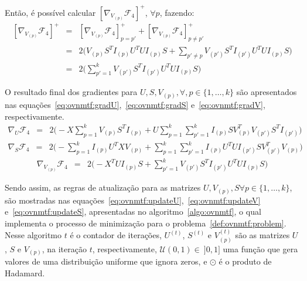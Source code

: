 \documentclass[
    12pt,                %
    oneside,            %
    a4paper,            %
    english,            %
    brazil                %
    ]{abntex2ppgsi}
\begin{document}
Então, é possível calcular $[\nabla_{V_{(p)}} \mathcal{F}_4]^{+}$, $\forall p$, fazendo:
\[
    \begin{array}{lcl}
        [\nabla_{V_{(p)}} \mathcal{F}_4]^{+} & = & [\nabla_{V_{(p)}} \mathcal{F}_4]^{+}_{p = p'} + [\nabla_{V_{(p)}} \mathcal{F}_4]^{+}_{p \neq p'} \\
                                             & = & 2 \big( V_{(p)} S^T I_{(p)} U^T U I_{(p)} S + \sum_{p' \neq p} V_{(p')} S^T I_{(p')} U^T U I_{(p)} S \big) \\
                                             & = & 2 \big( \sum_{p'=1}^{k} V_{(p')} S^T I_{(p')} U^T U I_{(p)} S \big)
    \end{array}
\]

O resultado final dos gradientes para $U, S, V_{(p)}, \forall, p \in \{1, \dots, k\}$ são apresentados nas equações~\ref{eq:ovnmtf:gradU},~\ref{eq:ovnmtf:gradS} e~\ref{eq:ovnmtf:gradV}, respectivamente.
\begin{equation}
\label{eq:ovnmtf:gradU}
    \begin{array}{lcl}
        \nabla_U \mathcal{F}_4 & = & 2 \big( - X \sum_{p=1}^{k} V_{(p)} S^T I_{(p)} + U \sum_{p=1}^k \sum_{p'=1}^{k} I_{(p)} S V_{(p)}^T V_{(p')} S^T I_{(p')} \big)
    \end{array}
\end{equation}
\begin{equation}
\label{eq:ovnmtf:gradS}
    \begin{array}{lcl}
        \nabla_S \mathcal{F}_4 & = & 2 \big( - \sum_{p=1}^{k} I_{(p)} U^T X V_{(p)} + \sum_{p=1}^{k} \sum_{p'=1}^{k} I_{(p)} U^T U I_{(p')} S V_{(p')}^T V_{(p)} \big)
    \end{array}
\end{equation}
\begin{equation}
\label{eq:ovnmtf:gradV}
    \begin{array}{lcl}
        \nabla_{V_{(p)}} \mathcal{F}_4 & = & 2 \big( -X^T U I_{(p)} S + \sum_{p'=1}^{k} V_{(p')} S^T I_{(p')} U^T U I_{(p)} S \big)
    \end{array}
\end{equation}

Sendo assim, as regras de atualização para as matrizes $U, V_{(p)}, S \forall p \in \{1, \dots, k\}$, são mostradas nas equações~\ref{eq:ovnmtf:updateU},~\ref{eq:ovnmtf:updateV} e~\ref{eq:ovnmtf:updateS}, apresentadas no algoritmo~\ref{algo:ovnmtf}, o qual implementa o processo de minimização para o problema~\ref{def:ovnmtf:problem}.
Nesse algoritmo $t$ é o contador de iterações, $U^{(t)}$, $S^{(t)}$ e $V_{(p)}^{(t)}$ são as matrizes $U$, $S$ e $V_{(p)}$, na iteração $t$, respectivamente, $\mathcal{U}(0, 1) \in~]0, 1]$ uma função que gera valores de uma distribuição uniforme que ignora zeros, e $\odot$ é o produto de Hadamard.
\end{document}
